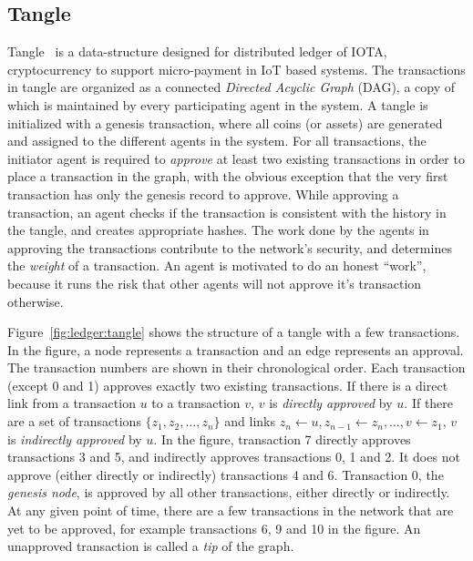 \subsection{Tangle}
 
Tangle~\citep{Popov:2018} is a data-structure designed for distributed ledger of IOTA, cryptocurrency to support micro-payment in IoT 
based systems. The transactions in tangle are organized as a connected {\em Directed Acyclic Graph} (DAG),
a copy of which is maintained
by every participating agent in the system.
%
A tangle is initialized with a genesis transaction, where all coins (or assets) are generated and assigned to the different agents
in the system. 
For all transactions, the initiator agent is required to {\em approve} at least two existing transactions in order to place a 
transaction in the graph, with the obvious exception that the very first transaction has only the genesis record to approve. 
While approving a transaction, an agent checks if the transaction is consistent with the history in the tangle, and creates 
appropriate hashes. The work done by the agents in approving the transactions contribute to the network's security, and determines 
the {\em weight} of a transaction.  An agent is motivated to do an honest ``work'', because it runs the risk that other agents 
will not approve it's transaction otherwise.

Figure~\ref{fig:ledger:tangle} shows the structure of a tangle with a few transactions. In the figure, a node represents 
a transaction and an edge represents an approval. The transaction numbers are shown in their chronological order. Each transaction 
(except 0 and 1) approves exactly two existing transactions. If there is a direct link from a transaction $u$ to a transaction $v$, 
$v$ is {\em directly approved} by $u$. If there are a set of transactions $\{ z_1, z_2, \dots, z_n \}$ and links 
$z_n \leftarrow u, z_{n-1} \leftarrow z_n, \dots, v \leftarrow z_1$, $v$ is {\em indirectly approved} by $u$. 
%
In the figure, transaction 7 directly approves transactions 3 and 5, and indirectly approves transactions 0, 1 and 2. It does not 
approve (either directly or indirectly) transactions 4 and 6. Transaction 0, the {\em genesis node}, is approved by all other 
transactions, either directly or indirectly. 
%
At any given point of time, there are a few transactions in the network that are yet to be approved, for example transactions 6, 
9 and 10 in the figure. An unapproved transaction is called a {\em tip} of the graph.

